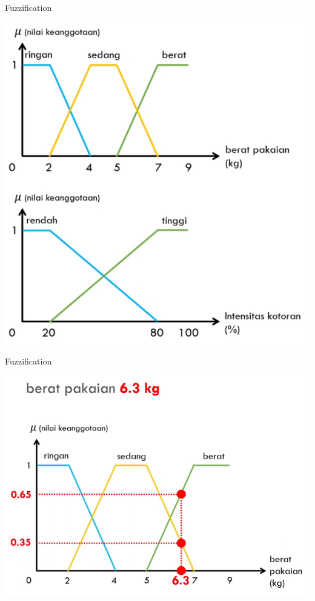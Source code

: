 \documentclass[pdflatex,compress,mathserif]{beamer}
\begin{document}
\begin{frame}{Fuzzification}
	\begin{center}
		\includegraphics[height=0.9\textheight]{img/23}
	\end{center}
\end{frame}

\begin{frame}{Fuzzification}
	\begin{center}
		\includegraphics[height=0.8\textheight]{img/24}
	\end{center}
\end{frame}
\end{document}
